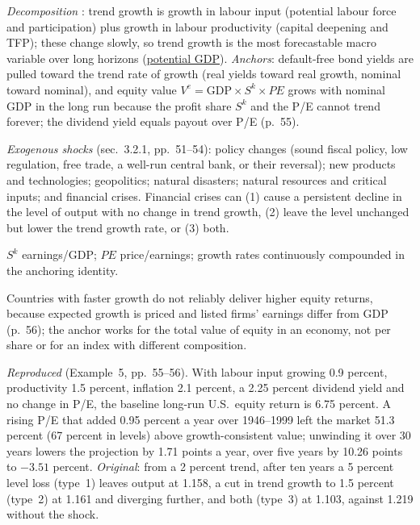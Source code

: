 \begin{qfmethod}\label{meth:growth-shocks-long-run-expectations}
 \emph{Decomposition} \citep[chap.~3, sec.~3.2.2, pp.~54--56]{portfolio-management-in-practice-v1-2020}: trend growth is growth in labour input (potential labour force and participation) plus growth in labour productivity (capital deepening and TFP); these change slowly, so trend growth is the most forecastable macro variable over long horizons (\hyperref[meth:potential-gdp-growth-accounting]{potential GDP}). \emph{Anchors}: default-free bond yields are pulled toward the trend rate of growth (real yields toward real growth, nominal toward nominal), and equity value $V^e=\text{GDP}\times S^k\times PE$ grows with nominal GDP in the long run because the profit share $S^k$ and the P/E cannot trend forever; the dividend yield equals payout over P/E (p.~55).

\emph{Exogenous shocks} (sec.~3.2.1, pp.~51--54): policy changes (sound fiscal policy, low regulation, free trade, a well-run central bank, or their reversal); new products and technologies; geopolitics; natural disasters; natural resources and critical inputs; and financial crises. Financial crises can (1) cause a persistent decline in the level of output with no change in trend growth, (2) leave the level unchanged but lower the trend growth rate, or (3) both.

 $S^k$ earnings/GDP; $PE$ price/earnings; growth rates continuously compounded in the anchoring identity.

 Countries with faster growth do not reliably deliver higher equity returns, because expected growth is priced and listed firms' earnings differ from GDP (p.~56); the anchor works for the total value of equity in an economy, not per share or for an index with different composition.

 \emph{Reproduced} (Example~5, pp.~55--56). With labour input growing 0.9 percent, productivity 1.5 percent, inflation 2.1 percent, a 2.25 percent dividend yield and no change in P/E, the baseline long-run U.S.\ equity return is 6.75 percent. A rising P/E that added 0.95 percent a year over 1946--1999 left the market 51.3 percent (67 percent in levels) above growth-consistent value; unwinding it over 30 years lowers the projection by 1.71 points a year, over five years by 10.26 points to $-3.51$ percent. \emph{Original}: from a 2 percent trend, after ten years a 5 percent level loss (type~1) leaves output at 1.158, a cut in trend growth to 1.5 percent (type~2) at 1.161 and diverging further, and both (type~3) at 1.103, against 1.219 without the shock.


\end{qfmethod}
